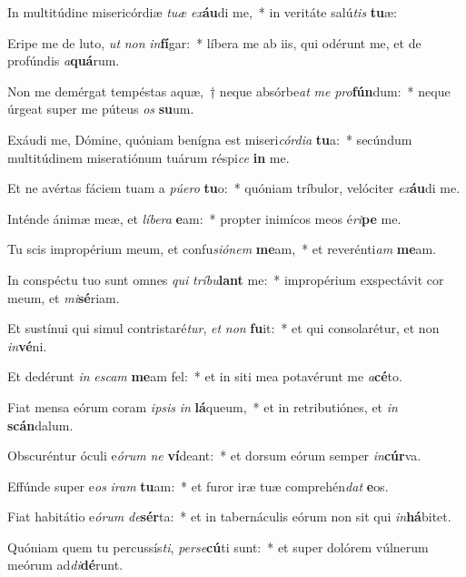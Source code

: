 \item In multitúdine misericórdiæ \textit{tu}\textit{æ} \textit{ex}\textbf{áu}di me,~* in veritáte salú\textit{tis} \textbf{tu}æ:
\item Eripe me de luto, \textit{ut} \textit{non} \textit{in}\textbf{fí}gar:~* líbera me ab iis, qui odérunt me, et de profúndis \textit{a}\textbf{quá}rum.
\item Non me demérgat tempéstas aquæ,~† neque absórbe\textit{at} \textit{me} \textit{pro}\textbf{fún}dum:~* neque úrgeat super me púteus \textit{os} \textbf{su}um.
\item Exáudi me, Dómine, quóniam benígna est miseri\textit{cór}\textit{di}\textit{a} \textbf{tu}a:~* secúndum multitúdinem miseratiónum tuárum réspi\textit{ce} \textbf{in} me.
\item Et ne avértas fáciem tuam a \textit{pú}\textit{e}\textit{ro} \textbf{tu}o:~* quóniam tríbulor, velóciter \textit{ex}\textbf{áu}di me.
\item Inténde ánimæ meæ, et \textit{lí}\textit{be}\textit{ra} \textbf{e}am:~* propter inimícos meos é\textit{ri}\textbf{pe} me.
\item Tu scis impropérium meum, et confu\textit{si}\textit{ó}\textit{nem} \textbf{me}am,~* et reverénti\textit{am} \textbf{me}am.
\item In conspéctu tuo sunt omnes \textit{qui} \textit{trí}\textit{bu}\textbf{lant} me:~* impropérium exspectávit cor meum, et \textit{mi}\textbf{sé}riam.
\item Et sustínui qui simul contristaré\textit{tur}, \textit{et} \textit{non} \textbf{fu}it:~* et qui consolarétur, et non \textit{in}\textbf{vé}ni.
\item Et dedérunt \textit{in} \textit{es}\textit{cam} \textbf{me}am fel:~* et in siti mea potavérunt me \textit{a}\textbf{cé}to.
\item Fiat mensa eórum coram \textit{ip}\textit{sis} \textit{in} \textbf{lá}queum,~* et in retributiónes, et \textit{in} \textbf{scán}dalum.
\item Obscuréntur óculi e\textit{ó}\textit{rum} \textit{ne} \textbf{ví}deant:~* et dorsum eórum semper \textit{in}\textbf{cúr}va.
\item Effúnde super e\textit{os} \textit{i}\textit{ram} \textbf{tu}am:~* et furor iræ tuæ comprehén\textit{dat} \textbf{e}os.
\item Fiat habitátio e\textit{ó}\textit{rum} \textit{de}\textbf{sér}ta:~* et in tabernáculis eórum non sit qui \textit{in}\textbf{há}bitet.
\item Quóniam quem tu percussís\textit{ti}, \textit{per}\textit{se}\textbf{cú}ti sunt:~* et super dolórem vúlnerum meórum ad\textit{di}\textbf{dé}runt.

